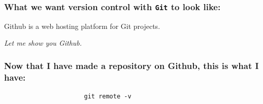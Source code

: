\documentclass{beamer}
\begin{document}
\begin{frame}
\frametitle{What we want version control with \texttt{Git} to look like:}
\begin{center}
\pause

Github is a web hosting platform for Git projects. \pause

\textit{Let me show you Github.}
\end{center}
\end{frame}

\begin{frame}[fragile]
\frametitle{Now that I have made a repository on Github, this is what I have:}
\begin{center}
\pause

\begin{verbatim}
                      git remote -v
\end{verbatim}
\end{center}
\end{frame}
\end{document}
